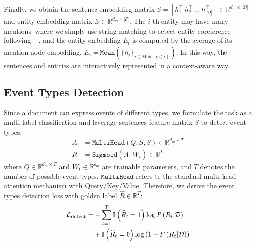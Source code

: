 \documentclass[11pt,a4paper]{article}
\begin{document}
Finally, we obtain the sentence embedding matrix $S = [h_1^\top \ h_2^\top \ \dots \  h_{\left| \mathcal{D} \right |}^\top] \in \mathbb{R}^{d_m \times \left| \mathcal{D} \right |}$ and entity embedding matrix $E \in \mathbb{R}^{d_m \times {\left | \mathcal{E} \right |}}$. 
The $i$-th entity may have many mentions, where we simply use string matching to detect entity coreference following ~\citet{zheng-etal-2019-doc2edag}
, and the entity embedding $E_i$ is computed by the average of its mention node embedding, $E_i = \texttt{Mean}(\{h_j \}_{j \in \mathrm{Mention}(i)})$.
In this way, the sentences and entities are interactively represented in a context-aware way.

\subsection{Event Types Detection}
\label{sec:detect_events}
Since a document can express events of different types, we formulate the task as a multi-label classification and leverage sentences feature matrix $S$ to detect event types:
\begin{equation*}
\begin{split}
    A &= \texttt{MultiHead}(Q, S, S) \in \mathbb{R}^{d_m \times T} \\
    R &= \texttt{Sigmoid}(A^\top W_t) \in \mathbb{R}^{T}
\end{split}
\end{equation*}
where $Q \in \mathbb{R}^{d_m \times T}$ and $W_t \in \mathbb{R}^{d_m}$ are trainable parameters, and $T$ denotes the number of possible event types.
$\texttt{MultiHead}$ refers to the standard multi-head attention mechanism with Query/Key/Value.
Therefore, we derive the event types detection loss with golden label $\widehat{R} \in \mathbb{R}^{T} $:
\begin{equation}
\setlength\abovedisplayskip{8pt}
\setlength\belowdisplayskip{8pt}
\begin{split}
    \mathcal{L}_{\mathrm{detect}} =& - \sum_{t=1}^{T} \mathbb{I} \left ( \widehat{R}_t=1 \right ) \log P \left ( R_t|\mathcal{D} \right ) \\ 
     & + \mathbb{I} \left ( \widehat{R}_t=0 \right ) \log \left(  1 - P \left ( R_t |\mathcal{D}\right ) \right )
\end{split}
\label{loss:detect}
\end{equation}
\end{document}
